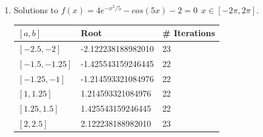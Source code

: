 \documentclass[a4paper,11pt]{article}
\begin{document}
\begin{enumerate}
\begin{enumerate}
		
		\item Solutions to $f(x) = 4e^{-x^{2}/5} - cos(5x) - 2 = 0 \  \ 
		x\in[-2\pi,2\pi]$.
		
		\begin{center}
			\begin{tabular}{l|ll}
				$[a,b]$        & Root       & \# Iterations \\ \hline
				$[-2.5,-2]$    & -2.122238188982010 & 23            \\
				$[-1.5,-1.25]$ & -1.425543159246445 & 22            \\
				$[-1.25,-1]$   & -1.214593321084976 & 22            \\
				$[1,1.25]$     & 1.214593321084976  & 22            \\
				$[1.25,1.5]$   & 1.425543159246445  & 22            \\
				$[2,2.5]$      & 2.122238188982010  & 23           
			\end{tabular}
		\end{center}
	\end{enumerate}



\end{enumerate}
\end{document}
